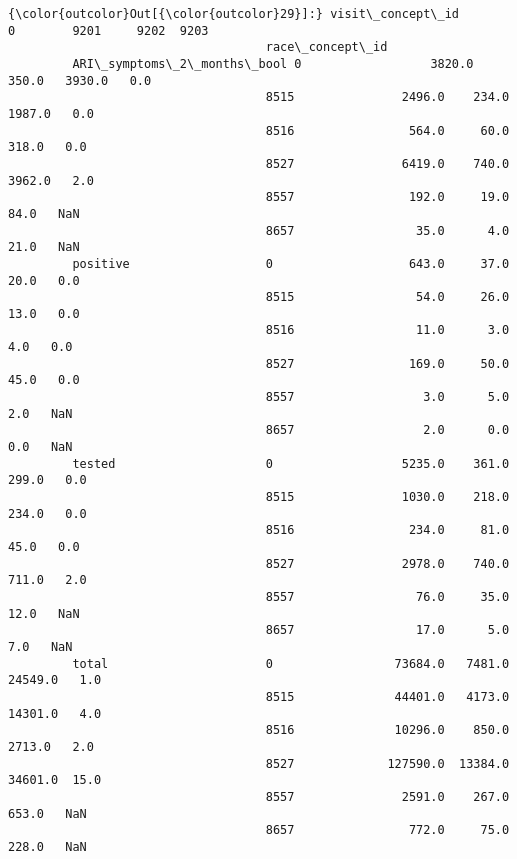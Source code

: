\documentclass[11pt]{article}
\begin{document}
\begin{Verbatim}[commandchars=\\\{\}]
{\color{outcolor}Out[{\color{outcolor}29}]:} visit\_concept\_id                                0        9201     9202  9203
                                    race\_concept\_id                                  
         ARI\_symptoms\_2\_months\_bool 0                  3820.0    350.0   3930.0   0.0
                                    8515               2496.0    234.0   1987.0   0.0
                                    8516                564.0     60.0    318.0   0.0
                                    8527               6419.0    740.0   3962.0   2.0
                                    8557                192.0     19.0     84.0   NaN
                                    8657                 35.0      4.0     21.0   NaN
         positive                   0                   643.0     37.0     20.0   0.0
                                    8515                 54.0     26.0     13.0   0.0
                                    8516                 11.0      3.0      4.0   0.0
                                    8527                169.0     50.0     45.0   0.0
                                    8557                  3.0      5.0      2.0   NaN
                                    8657                  2.0      0.0      0.0   NaN
         tested                     0                  5235.0    361.0    299.0   0.0
                                    8515               1030.0    218.0    234.0   0.0
                                    8516                234.0     81.0     45.0   0.0
                                    8527               2978.0    740.0    711.0   2.0
                                    8557                 76.0     35.0     12.0   NaN
                                    8657                 17.0      5.0      7.0   NaN
         total                      0                 73684.0   7481.0  24549.0   1.0
                                    8515              44401.0   4173.0  14301.0   4.0
                                    8516              10296.0    850.0   2713.0   2.0
                                    8527             127590.0  13384.0  34601.0  15.0
                                    8557               2591.0    267.0    653.0   NaN
                                    8657                772.0     75.0    228.0   NaN
\end{Verbatim}
            
    \begin{center}
    \end{center}
    { \hspace*{\fill} \\}
    
\end{document}
